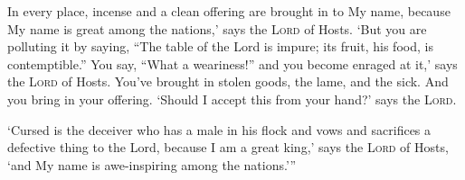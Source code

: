 \begin{inparaenum}
    \noindent In every place, incense and a clean offering are brought in to My name, because My name is great among the nations,' says the \textsc{Lord} of Hosts.%
     `But you are polluting it by saying, ``The table of the Lord is impure; its fruit, his food, is contemptible.''%
     You say, ``What a weariness!'' and you become enraged at it,' says the \textsc{Lord} of Hosts. You've brought in stolen goods, the lame, and the sick. And you bring in your offering. `Should I accept this from your hand?' says the \textsc{Lord}.%
    
     `Cursed is the deceiver who has a male in his flock and vows and sacrifices a defective thing to the Lord, because I am a great king,' says the \textsc{Lord} of Hosts, `and My name is awe-inspiring among the nations.'\thinspace''%
\end{inparaenum}
